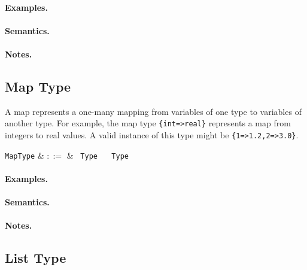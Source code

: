 \paragraph{Examples.}

\paragraph{Semantics.}

\paragraph{Notes.} 


\subsection{Map Type}

A map represents a one-many mapping from variables of one type to variables of another type. For example, the map type \lstinline|{int=>real}| represents a map from integers to real values. A valid instance of this type might be \lstinline|{1=>1.2,2=>3.0}|.

\begin{syntax}
  \verb+MapType+ & $::=$ & \token{\{} \ \verb+Type+ \ \token{=>} \ \verb+Type+ \ \token{\}} \\
\end{syntax}

\paragraph{Examples.}

\paragraph{Semantics.}

\paragraph{Notes.} 


\subsection{List Type}

